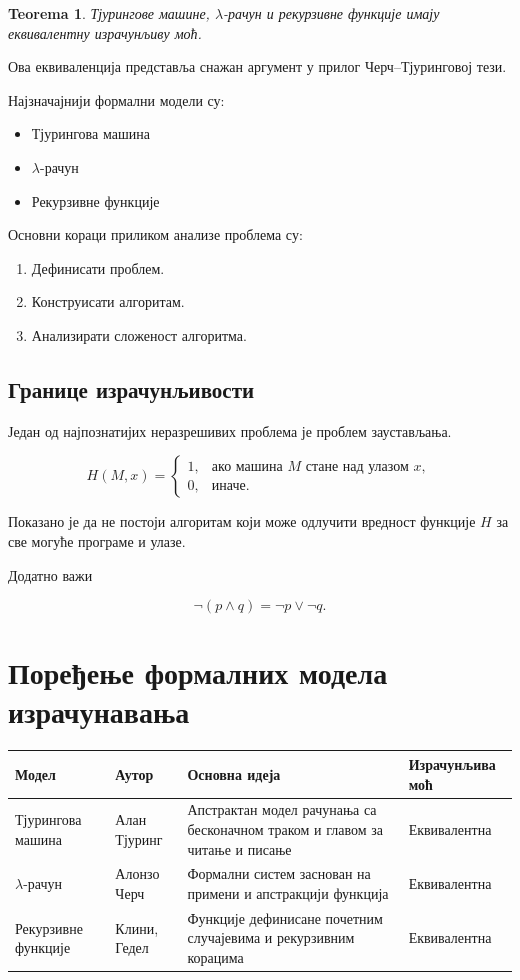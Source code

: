 \documentclass[a4paper,12pt]{article}
\newtheorem{teorema}{Teorema}
\begin{document}
\begin{teorema}
Тјурингове машине, $\lambda$-рачун и рекурзивне функције имају
еквивалентну израчунљиву моћ.
\end{teorema}

Ова еквиваленција представља снажан аргумент у прилог
Черч--Тјуринговој тези.

Најзначајнији формални модели су:

\begin{itemize}
    \item Тјурингова машина
    \item $\lambda$-рачун
    \item Рекурзивне функције
\end{itemize}

Основни кораци приликом анализе проблема су:

\begin{enumerate}
    \item Дефинисати проблем.
    \item Конструисати алгоритам.
    \item Анализирати сложеност алгоритма.
\end{enumerate}

\subsection{Границе израчунљивости}

Један од најпознатијих неразрешивих проблема је проблем заустављања.

\[
H(M,x)=
\begin{cases}
1, & \text{ако машина }M\text{ стане над улазом }x,\\
0, & \text{иначе.}
\end{cases}
\]

Показано је да не постоји алгоритам који може одлучити вредност
функције $H$ за све могуће програме и улазе.

Додатно важи

\[
\neg(p\land q)=\neg p\lor \neg q.
\]

\section{Поређење формалних модела израчунавања}

\begin{center}
\begin{tabular}{|p{3.2cm}|p{2.5cm}|p{5cm}|p{2.5cm}|}
\hline
\textbf{Модел} & \textbf{Аутор} & \textbf{Основна идеја} & \textbf{Израчунљива моћ}\\
\hline
Тјурингова машина & Алан Тјуринг & Апстрактан модел рачунања са бесконачном траком и главом за читање и писање & Еквивалентна\\
\hline
$\lambda$-рачун & Алонзо Черч & Формални систем заснован на примени и апстракцији функција & Еквивалентна\\
\hline
Рекурзивне функције & Клини, Гедел & Функције дефинисане почетним случајевима и рекурзивним корацима & Еквивалентна\\
\hline
\end{tabular}
\end{center}
\end{document}
